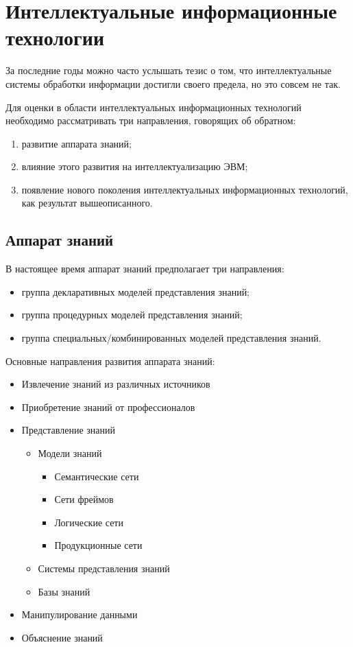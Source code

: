 \documentclass[a4paper,12pt]{report}
\begin{document}
\section{Интеллектуальные информационные технологии}

	За последние годы можно часто услышать тезис о том, что интеллектуальные
	системы обработки информации достигли своего предела, но это совсем не
	так.\par
	Для оценки в области интеллектуальных информационных технологий необходимо
	рассматривать три направления, говорящих об обратном:
	\begin{enumerate}
		\item развитие аппарата знаний;
		\item влияние этого развития на интеллектуализацию ЭВМ;
		\item появление нового поколения интеллектуальных информационных
			технологий, как результат вышеописанного.
	\end{enumerate}


\subsection{Аппарат знаний}

	В настоящее время аппарат знаний предполагает три направления:
	\begin{itemize}
		\item группа декларативных моделей представления знаний;
		\item группа процедурных моделей представления знаний;
		\item группа специальных/комбинированных моделей представления знаний. \\
	\end{itemize}

	Основные направления развития аппарата знаний:
	\begin{itemize}
		\item Извлечение знаний из различных источников
		\item Приобретение знаний от профессионалов
		\item Представление знаний
			\begin{itemize}
				\item Модели знаний
					\begin{itemize}
						\item Семантические сети
						\item Сети фреймов
						\item Логические сети
						\item Продукционные сети
					\end{itemize}
				\item Системы представления знаний
				\item Базы знаний
			\end{itemize}
		\item Манипулирование данными
		\item Объяснение знаний \\
	\end{itemize}
\end{document}
